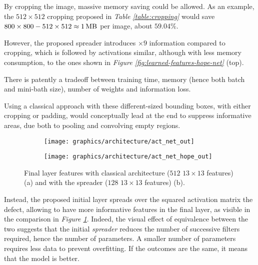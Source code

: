         \par{
            By cropping the image, massive memory saving could be allowed. As an example, the $512\times 512$ cropping proposed in \emph{Table \ref{table:cropping}} would save $800\times 800 - 512\times 512 \approx \SI{1}{\mega\byte}$ per image, about $59.04\%$.
        }
        \par{
            However, the proposed spreader introduces $\times 9$ information compared to cropping, which is followed by activations similar, although with less memory consumption, to the ones shown in \emph{Figure \ref{fig:learned-features-hope-net}} (top).
        }
        \par{
            There is patently a tradeoff between training time, memory (hence both batch and mini-bath size), number of weights and information loss.
        }
        \par{
            Using a classical approach with these different-sized bounding boxes, with either cropping or padding, would conceptually lead at the end to suppress informative areas, due both to pooling and convolving empty regions.
        }
        \begin{figure}
            \centering
            \begin{subfigure}{.5\linewidth}
                \centering
                \texttt{[image: graphics/architecture/act\_net\_out]}
            \end{subfigure}\hfill
            \begin{subfigure}{.5\linewidth}
                \centering
                \texttt{[image: graphics/architecture/act\_net\_hope\_out]}
            \end{subfigure}
            \caption{Final layer features with classical architecture ($512$ $13\times 13$ features) (a) and with the spreader ($128$ $13\times 13$ features) (b).}
            \label{fig:features-last-layer}
        \end{figure}
        \par{
            Instead, the proposed initial layer spreads over the squared activation matrix the defect, allowing to have more informative features in the final layer, as visible in the comparison in \emph{Figure \ref{fig:features-last-layer}}. Indeed, the visual effect of equivalence between the two suggests that the initial \emph{spreader} reduces the number of successive filters required, hence the number of parameters. A smaller number of parameters requires less data to prevent overfitting. If the outcomes are the same, it means that the model is better.
        }
